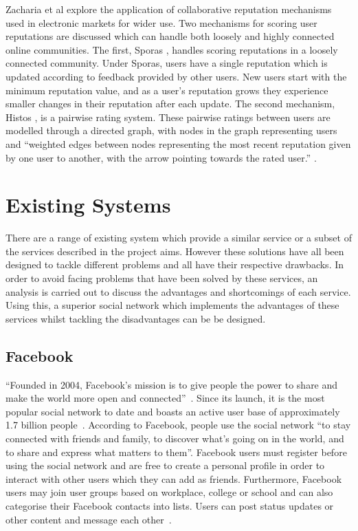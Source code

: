 Zacharia et al explore the application of collaborative reputation mechanisms used in electronic markets for wider use. Two mechanisms for scoring user reputations are discussed which can handle both loosely and highly connected online communities. The first, Sporas \cite{zacharia2000}, handles scoring reputations in a loosely connected community. Under Sporas, users have a single reputation which is updated according to feedback provided by other users. New users start with the minimum reputation value, and as a user’s reputation grows they experience smaller changes in their reputation after each update. The second mechanism, Histos \cite{zacharia2000}, is a pairwise rating system. These pairwise ratings between users are modelled through a directed graph, with nodes in the graph representing users and ``weighted edges between nodes representing the most recent reputation given by one user to another, with the arrow pointing towards the rated user.'' \cite{zacharia2000}.

\section{Existing Systems}
There are a range of existing system which provide a similar service or a subset of the services described in the project aims. However these solutions have all been designed to tackle different problems and all have their respective drawbacks. In order to avoid facing problems that have been solved by these services, an analysis is carried out to discuss the advantages and shortcomings of each service. Using this, a superior social network which implements the advantages of these services whilst tackling the disadvantages can be be designed.

\subsection{Facebook}
``Founded in 2004, Facebook's mission is to give people the power to share and make the world more open and connected''~\cite{Facebook:About}. Since its launch, it is the most popular social network to date and boasts an active user base of approximately 1.7 billion people~\cite{Statista:Facebook}. According to Facebook, people use the social network ``to stay connected with friends and family, to discover what's going on in the world, and to share and express what matters to them''. Facebook users must register before using the social network and are free to create a personal profile in order to interact with other users which they can add as friends. Furthermore, Facebook users may join user groups based on workplace, college or school and can also categorise their Facebook contacts into lists. Users can post status updates or other content and message each other~\cite{Statista:Facebook}. 

